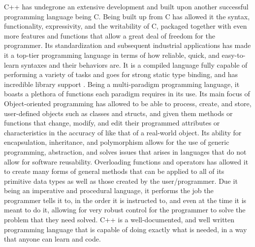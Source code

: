 \documentclass[12pt]{article}
\begin{document}
C++ has undegrone an extensive development and built upon another successful programming language being C. Being built up from C has allowed it the syntax, functionality, expressivity, and the writability of C, packaged together with even more features and functions that allow a great deal of freedom for the programmer. Its standardization and subsequent industrial applications has made it a top-tier programming language in terms of how reliable, quick, and easy-to-learn syntaxes and their behaviors are. It is a compiled language fully capable of performing a variety of tasks and goes for strong static type binding, and has incredible library support . Being a multi-paradigm programming language, it boasts a plethora of functions each paradigm requires in its use. Its main focus of Object-oriented programming has allowed to be able to process, create, and store, user-defined objects such as classes and structs, and given them methods or functions that change, modify, and edit their programmed attributes or characteristics in the accuracy of like that of a real-world object. Its ability for encapsulation, inheritance, and polymorphism allows for the use of generic programming, abstraction, and solves issues that arises in languages that do not allow for software reusability. Overloading functions and operators has allowed it to create many forms of general methods that can be applied to all of its primitive data types as well as those created by the user/programmer. Due it being an imperative and procedural language, it performs the job the programmer tells it to, in the order it is instructed to, and even at the time it is meant to do it, allowing for very robust control for the programmer to solve the problem that they need solved. C++ is a well-documented, and well written programming language that is capable of doing exactly what is needed, in a way that anyone can learn and code.
\end{document}

